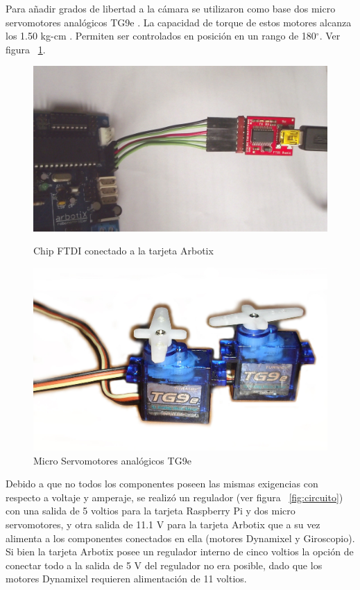 Para añadir grados de libertad a la c\'amara se utilizaron como base dos micro servomotores anal\'ogicos TG9e \cite{microservo}. La capacidad de torque de estos motores alcanza los 1.50 kg-cm . Permiten ser controlados en posición en un rango de 180$^{\circ}$. Ver figura ~\ref{fig:Servo}.   

\begin{figure}[hbtp]
\centering
\includegraphics[scale=0.06]{imagenes/DSCF1162.jpg}
\caption{Chip FTDI conectado a la tarjeta Arbotix}
\label{fig:ftdi}
\centering
\includegraphics[scale=0.09]{imagenes/servosTg9B.jpg}
\caption{Micro Servomotores analógicos TG9e}
\label{fig:Servo}
\end{figure}

Debido a que no todos los componentes poseen las mismas exigencias con respecto a voltaje y amperaje, se realizó un regulador (ver figura ~\ref{fig:circuito}) con una salida de 5 voltios para la tarjeta Raspberry Pi y dos micro servomotores, y otra salida de 11.1 V para la tarjeta Arbotix que a su vez alimenta a los componentes conectados en ella (motores Dynamixel y Giroscopio). Si bien la tarjeta Arbotix posee un regulador interno de cinco voltios la opción de conectar todo a la salida de 5 V del regulador no era posible, dado que los motores Dynamixel requieren alimentación de 11 voltios.

